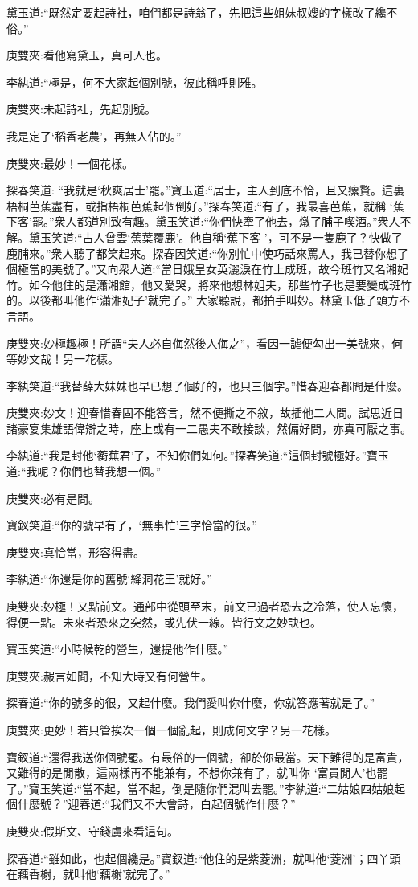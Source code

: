 \begin{parag}
    黛玉道:“既然定要起詩社，咱們都是詩翁了，先把這些姐妹叔嫂的字樣改了纔不俗。”\begin{note}庚雙夾:看他寫黛玉，真可人也。\end{note}李紈道:“極是，何不大家起個別號，彼此稱呼則雅。\begin{note}庚雙夾:未起詩社，先起別號。\end{note}我是定了‘稻香老農’，再無人佔的。”\begin{note}庚雙夾:最妙！一個花樣。\end{note}探春笑道: “我就是‘秋爽居士’罷。”寶玉道:“居士，主人到底不恰，且又瘰贅。這裏梧桐芭蕉盡有，或指梧桐芭蕉起個倒好。”探春笑道:“有了，我最喜芭蕉，就稱 ‘蕉下客’罷。”衆人都道別致有趣。黛玉笑道:“你們快牽了他去，燉了脯子喫酒。”衆人不解。黛玉笑道:“古人曾雲‘蕉葉覆鹿’。他自稱‘蕉下客 ’，可不是一隻鹿了？快做了鹿脯來。”衆人聽了都笑起來。探春因笑道:“你別忙中使巧話來罵人，我已替你想了個極當的美號了。”又向衆人道:“當日娥皇女英灑淚在竹上成斑，故今斑竹又名湘妃竹。如今他住的是瀟湘館，他又愛哭，將來他想林姐夫，那些竹子也是要變成斑竹的。以後都叫他作‘瀟湘妃子’就完了。” 大家聽說，都拍手叫妙。林黛玉低了頭方不言語。\begin{note}庚雙夾:妙極趣極！所謂“夫人必自侮然後人侮之”，看因一謔便勾出一美號來，何等妙文哉！另一花樣。\end{note}李紈笑道:“我替薛大妹妹也早已想了個好的，也只三個字。”惜春迎春都問是什麼。\begin{note}庚雙夾:妙文！迎春惜春固不能答言，然不便撕之不敘，故插他二人問。試思近日諸豪宴集雄語偉辯之時，座上或有一二愚夫不敢接談，然偏好問，亦真可厭之事。\end{note}李紈道:“我是封他‘蘅蕪君’了，不知你們如何。”探春笑道:“這個封號極好。”寶玉道:“我呢？你們也替我想一個。”\begin{note}庚雙夾:必有是問。\end{note}寶釵笑道:“你的號早有了，‘無事忙’三字恰當的很。”\begin{note}庚雙夾:真恰當，形容得盡。\end{note}李紈道:“你還是你的舊號‘絳洞花王’就好。”\begin{note}庚雙夾:妙極！又點前文。通部中從頭至末，前文已過者恐去之冷落，使人忘懷，得便一點。未來者恐來之突然，或先伏一線。皆行文之妙訣也。\end{note}寶玉笑道:“小時候乾的營生，還提他作什麼。”\begin{note}庚雙夾:赧言如聞，不知大時又有何營生。\end{note}探春道:“你的號多的很，又起什麼。我們愛叫你什麼，你就答應著就是了。”\begin{note}庚雙夾:更妙！若只管挨次一個一個亂起，則成何文字？另一花樣。\end{note}寶釵道:“還得我送你個號罷。有最俗的一個號，卻於你最當。天下難得的是富貴，又難得的是閒散，這兩樣再不能兼有，不想你兼有了，就叫你 ‘富貴閒人’也罷了。”寶玉笑道:“當不起，當不起，倒是隨你們混叫去罷。”李紈道:“二姑娘四姑娘起個什麼號？”迎春道:“我們又不大會詩，白起個號作什麼？”\begin{note}庚雙夾:假斯文、守錢虜來看這句。\end{note}探春道:“雖如此，也起個纔是。”寶釵道:“他住的是紫菱洲，就叫他‘菱洲’；四丫頭在藕香榭，就叫他‘藕榭’就完了。”
\end{parag}


